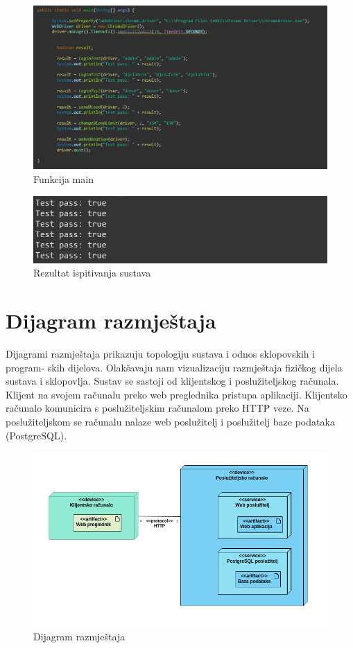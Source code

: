 \begin{figure}[H]
	\centering
	\includegraphics[width=\textwidth, scale=0.5]{slike/main}
	\caption{Funkcija main}
\end{figure}
\begin{figure}[H]
	\centering
	\includegraphics[width=\textwidth, scale=0.5]{slike/rezultat}
	\caption{Rezultat ispitivanja sustava}
\end{figure}
\eject
		\section{Dijagram razmještaja}
			
			Dijagrami razmještaja prikazuju topologiju sustava i odnos sklopovskih i program-
skih dijelova. Olakšavaju nam vizualizaciju razmještaja fizičkog dijela sustava i
sklopovlja. Sustav se sastoji od klijentskog i poslužiteljskog računala. Klijent na
svojem računalu preko web preglednika pristupa aplikaciji. Klijentsko računalo
komunicira s poslužiteljskim računalom preko HTTP veze. Na poslužiteljskom se
računalu nalaze web poslužitelj i poslužitelj baze podataka (PostgreSQL).

\begin{figure}[H]
	\centering
	\includegraphics[width=\textwidth, scale=0.5]{dijagrami/dijagram_razmjestaja}
	\caption{Dijagram razmještaja}
	\label{fig:dijagram_razmještaja}
\end{figure}
\eject
	
